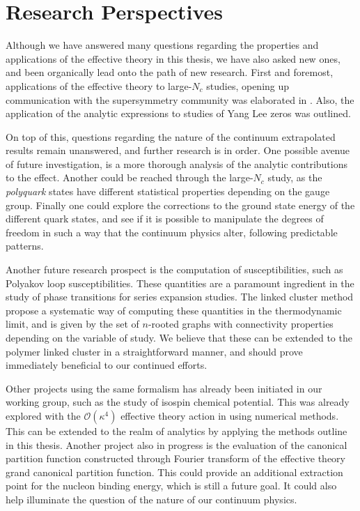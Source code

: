 \chapter{Research Perspectives}

Although we have answered many questions regarding the properties and
applications of the effective theory in this thesis, we have also asked new
ones, and been organically lead onto the path of new research. First and
foremost, applications of the effective theory to large-$N_c$ studies, opening
up communication with the supersymmetry community was elaborated in
. Also, the application of the analytic expressions
to studies of Yang Lee zeros was outlined.

On top of this, questions regarding the nature of the continuum extrapolated
results remain unanswered, and further research is in order. One possible avenue
of future investigation, is a more thorough analysis of the analytic
contributions to the effect. Another could be reached through the large-$N_c$
study, as the \emph{polyquark} states have different statistical properties
depending on the gauge group. Finally one could explore the corrections to the
ground state energy of the different quark states, and see if it is possible to
manipulate the degrees of freedom in such a way that the continuum physics
alter, following predictable patterns.

Another future research prospect is the computation of susceptibilities, such as
Polyakov loop susceptibilities. These quantities are a paramount ingredient in
the study of phase transitions for series expansion studies. The linked cluster
method propose a systematic way of computing these quantities in the
thermodynamic limit, and is given by the set of $n$-rooted graphs with
connectivity properties depending on the variable of study. We believe that
these can be extended to the polymer linked cluster in a straightforward manner,
and should prove immediately beneficial to our continued efforts.

Other projects using the same formalism has already been initiated in our
working group, such as the study of isospin chemical potential. This was already
explored with the $\mathcal{O}(\kappa^4)$ effective theory action in
\citep{Langelage:2014vpa} using numerical methods. This can be extended to the
realm of analytics by applying the methods outline in this thesis. Another
project also in progress is the evaluation of the canonical partition function
constructed through Fourier transform of the effective theory grand canonical
partition function. This could provide an additional extraction point for the
nucleon binding energy, which is still a future goal. It could also help
illuminate the question of the nature of our continuum physics.


